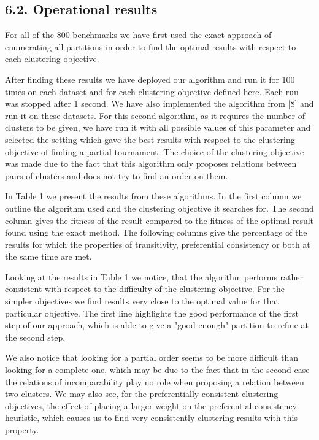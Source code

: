 \documentclass[10pt]{article}
\begin{document}
\subsection*{6.2. Operational results}
For all of the 800 benchmarks we have first used the exact approach of enumerating all partitions in order to find the optimal results with respect to each clustering objective.

After finding these results we have deployed our algorithm and run it for 100 times on each dataset and for each clustering objective defined here. Each run was stopped after 1 second. We have also implemented the algorithm from [8] and run it on these datasets. For this second algorithm, as it requires the number of clusters to be given, we have run it with all possible values of this parameter and selected the setting which gave the best results with respect to the clustering objective of finding a partial tournament. The choice of the clustering objective was made due to the fact that this algorithm only proposes relations between pairs of clusters and does not try to find an order on them.

In Table 1 we present the results from these algorithms. In the first column we outline the algorithm used and the clustering objective it searches for. The second column gives the fitness of the result compared to the fitness of the optimal result found using the exact method. The following columns give the percentage of the results for which the properties of transitivity, preferential consistency or both at the same time are met.

Looking at the results in Table 1 we notice, that the algorithm performs rather consistent with respect to the difficulty of the clustering objective. For the simpler objectives we find results very close to the optimal value for that particular objective. The first line highlights the good performance of the first step of our approach, which is able to give a "good enough" partition to refine at the second step.

We also notice that looking for a partial order seems to be more difficult than looking for a complete one, which may be due to the fact that in the second case the relations of incomparability play no role when proposing a relation between two clusters. We may also see, for the preferentially consistent clustering objectives, the effect of placing a larger weight on the preferential consistency heuristic, which causes us to find very consistently clustering results with this property.
\end{document}
